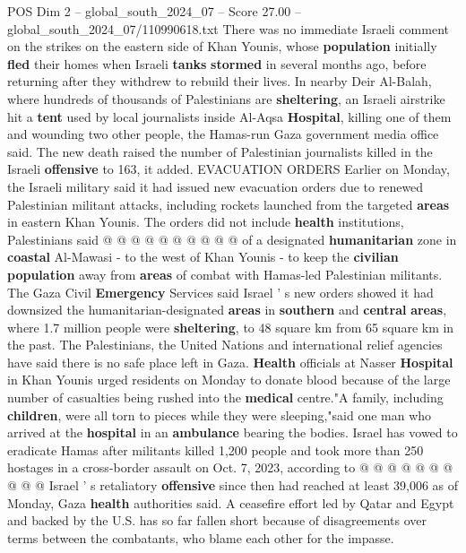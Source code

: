 \begin{textsample}{POS Dim 2 – global\_south\_2024\_07 – Score 27.00 – global\_south\_2024\_07/110990618.txt}
There was no immediate Israeli comment on the strikes on the eastern side of Khan Younis, whose \textbf{population} initially \textbf{fled} their homes when Israeli \textbf{tanks} \textbf{stormed} in several months ago, before returning after they withdrew to rebuild their lives.
In nearby Deir Al-Balah, where hundreds of thousands of Palestinians are \textbf{sheltering}, an Israeli airstrike hit a \textbf{tent} used by local journalists inside Al-Aqsa \textbf{Hospital}, killing one of them and wounding two other people, the Hamas-run Gaza government media office said.
The new death raised the number of Palestinian journalists killed in the Israeli \textbf{offensive} to 163, it added.
EVACUATION ORDERS Earlier on Monday, the Israeli military said it had issued new evacuation orders due to renewed Palestinian militant attacks, including rockets launched from the targeted \textbf{areas} in eastern Khan Younis.
The orders did not include \textbf{health} institutions, Palestinians said @ @ @ @ @ @ @ @ @ @ of a designated \textbf{humanitarian} zone in \textbf{coastal} Al-Mawasi - to the west of Khan Younis - to keep the \textbf{civilian} \textbf{population} away from \textbf{areas} of combat with Hamas-led Palestinian militants.
The Gaza Civil \textbf{Emergency} Services said Israel ' s new orders showed it had downsized the humanitarian-designated \textbf{areas} in \textbf{southern} and \textbf{central} \textbf{areas}, where 1.7 million people were \textbf{sheltering}, to 48 square km from 65 square km in the past.
The Palestinians, the United Nations and international relief agencies have said there is no safe place left in Gaza. \textbf{Health} officials at Nasser \textbf{Hospital} in Khan Younis urged residents on Monday to donate blood because of the large number of casualties being rushed into the \textbf{medical} centre."A family, including \textbf{children}, were all torn to pieces while they were sleeping,"said one man who arrived at the \textbf{hospital} in an \textbf{ambulance} bearing the bodies.
Israel has vowed to eradicate Hamas after militants killed 1,200 people and took more than 250 hostages in a cross-border assault on Oct. 7, 2023, according to @ @ @ @ @ @ @ @ @ @ Israel ' s retaliatory \textbf{offensive} since then had reached at least 39,006 as of Monday, Gaza \textbf{health} authorities said.
A ceasefire effort led by Qatar and Egypt and backed by the U.S. has so far fallen short because of disagreements over terms between the combatants, who blame each other for the impasse.

\end{textsample}
